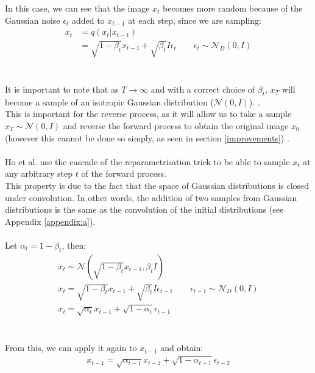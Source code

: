\documentclass[twoside]{article}
\numberwithin{equation}{section}
\numberwithin{figure}{section}
\begin{document}
In this case, we can see that the image $x_t$ becomes more random because of the Gaussian noise $\epsilon_t$ added to $x_{t-1}$ at each step, since we are sampling:
\begin{align}
  x_t &= q(x_t | x_{t-1}) \\
  &= \sqrt{1 - \beta_t} x_{t-1} + \sqrt{\beta_t}I \epsilon_t \qquad \epsilon_t \sim \mathcal{N}_D \left(0, I\right)
\end{align}
\\\\
It is important to note that as $T \rightarrow \infty$ and with a correct choice of $\beta_t$,  $x_T$ will become a sample of an isotropic Gaussian distribution ($\mathcal{N}\left(0, I\right)$). \cite{nichol2021improved} \cite{sohldickstein2015deep}. \\
This is important for the reverse process, as it will allow us to take a sample $x_T \sim \mathcal{N}\left(0, I\right)$ and reverse the forward process to obtain the original image $x_0$ (however this cannot be done so simply, as seen in section \ref{improvements}) \cite{nichol2021improved}.
\\\\
Ho et al. \cite{ho2020denoising} use the cascade of the reparametrisation trick to be able to sample $x_t$ at any arbitrary step $t$ of the forward process. \\
This property is due to the fact that the space of Gaussian distributions is closed under convolution. In other words, the addition of two samples from Gaussian distributions is the same as the convolution of the initial distributions (see Appendix \ref{appendix:a}).
\\\\
Let $\alpha_t = 1 - \beta_t$, then:
\begin{gather*}
  x_t \sim \mathcal{N}\left(\sqrt{1 - \beta_t} x_{t-1}, \beta_t I\right) \\
  x_t = \sqrt{1 - \beta_t} x_{t-1} + \sqrt{\beta_t }I \epsilon_{t-1} \qquad \epsilon_{t - 1} \sim \mathcal{N}_D \left(0, I\right) \\
  x_t = \sqrt{\alpha_t} x_{t-1} + \sqrt{1 - \alpha_t} \epsilon_{t - 1}
\end{gather*}
\\\\
From this, we can apply it again to $x_{t-1}$ and obtain:
\begin{gather*}
  x_{t-1} = \sqrt{\alpha_{t-1}} x_{t-2} + \sqrt{1 - \alpha_{t-1}} \epsilon_{t - 2}
\end{gather*}
\end{document}
